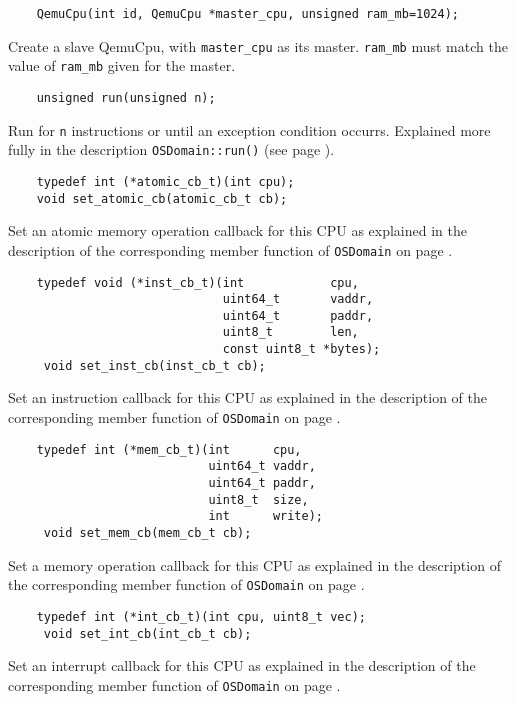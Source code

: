 \documentclass[letterpaper, 10pt]{book}
\begin{document}
\begin{verbatim}
    QemuCpu(int id, QemuCpu *master_cpu, unsigned ram_mb=1024);
\end{verbatim}
Create a slave QemuCpu, with \texttt{master\_cpu} as its master. 
\texttt{ram\_mb} must match the value of \texttt{ram\_mb} given for the master.

\begin{verbatim}
    unsigned run(unsigned n);
\end{verbatim}
Run for \texttt{n} instructions or until an exception condition occurrs. 
Explained more fully in the description \texttt{OSDomain::run()} (see page
\pageref{func:run}).

\begin{verbatim}
    typedef int (*atomic_cb_t)(int cpu);
    void set_atomic_cb(atomic_cb_t cb);
\end{verbatim}
Set an atomic memory operation callback for this CPU as explained in the 
description of the corresponding member function of \texttt{OSDomain} on page
\pageref{func:set_atomic_cb}.

\begin{verbatim}
    typedef void (*inst_cb_t)(int            cpu, 
                              uint64_t       vaddr, 
                              uint64_t       paddr, 
                              uint8_t        len, 
                              const uint8_t *bytes);
     void set_inst_cb(inst_cb_t cb);
\end{verbatim}
Set an instruction callback for this CPU as explained in the 
description of the corresponding member function of \texttt{OSDomain} on page
\pageref{func:set_inst_cb}.

\begin{verbatim}
    typedef int (*mem_cb_t)(int      cpu,
                            uint64_t vaddr,
                            uint64_t paddr, 
                            uint8_t  size, 
                            int      write);
     void set_mem_cb(mem_cb_t cb);
\end{verbatim}
Set a memory operation callback for this CPU as explained in the 
description of the corresponding member function of \texttt{OSDomain} on page
\pageref{func:set_mem_cb}.

\begin{verbatim}
    typedef int (*int_cb_t)(int cpu, uint8_t vec);
     void set_int_cb(int_cb_t cb);
\end{verbatim}
Set an interrupt callback for this CPU as explained in the 
description of the corresponding member function of \texttt{OSDomain} on page
\pageref{func:set_int_cb}.
\end{document}
